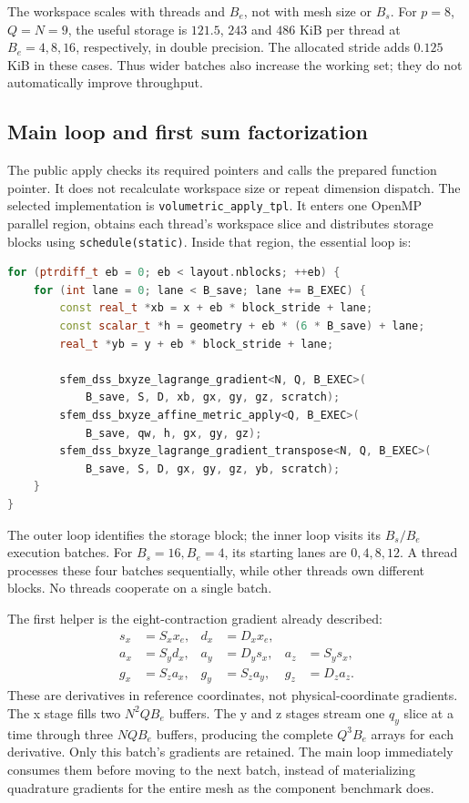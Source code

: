 \documentclass[11pt]{article}
\begin{document}
The workspace scales with threads and \(B_e\), not with mesh size or \(B_s\).
For \(p=8\), \(Q=N=9\), the useful storage is \(121.5\), \(243\) and
\(486\) KiB per thread at \(B_e=4,8,16\), respectively, in double precision.
The allocated stride adds \(0.125\) KiB in these cases. Thus wider batches
also increase the working set; they do not automatically improve throughput.

\subsection{Main loop and first sum factorization}

The public apply checks its required pointers and calls the prepared function
pointer. It does not recalculate workspace size or repeat dimension dispatch.
The selected implementation is \texttt{volumetric\_apply\_tpl}. It enters one
OpenMP parallel region, obtains each thread's workspace slice and distributes
storage blocks using \texttt{schedule(static)}. Inside that region, the
essential loop is:
\begin{lstlisting}[language=C++]
for (ptrdiff_t eb = 0; eb < layout.nblocks; ++eb) {
    for (int lane = 0; lane < B_save; lane += B_EXEC) {
        const real_t *xb = x + eb * block_stride + lane;
        const scalar_t *h = geometry + eb * (6 * B_save) + lane;
        real_t *yb = y + eb * block_stride + lane;

        sfem_dss_bxyze_lagrange_gradient<N, Q, B_EXEC>(
            B_save, S, D, xb, gx, gy, gz, scratch);
        sfem_dss_bxyze_affine_metric_apply<Q, B_EXEC>(
            B_save, qw, h, gx, gy, gz);
        sfem_dss_bxyze_lagrange_gradient_transpose<N, Q, B_EXEC>(
            B_save, S, D, gx, gy, gz, yb, scratch);
    }
}
\end{lstlisting}
The outer loop identifies the storage block; the inner loop visits its
\(B_s/B_e\) execution batches. For \(B_s=16,B_e=4\), its starting lanes are
\(0,4,8,12\). A thread processes these four batches sequentially, while other
threads own different blocks. No threads cooperate on a single batch.

The first helper is the eight-contraction gradient already described:
\[
\begin{aligned}
 s_x&=S_xx_e,& d_x&=D_xx_e,\\
 a_x&=S_yd_x,& a_y&=D_ys_x,& a_z&=S_ys_x,\\
 g_x&=S_za_x,& g_y&=S_za_y,& g_z&=D_za_z.
\end{aligned}
\]
These are derivatives in reference coordinates, not physical-coordinate
gradients. The x stage fills two \(N^2QB_e\) buffers. The y and z stages
stream one \(q_y\) slice at a time through three \(NQB_e\) buffers, producing
the complete \(Q^3B_e\) arrays for each derivative.
Only this batch's gradients are retained. The main loop immediately consumes
them before moving to the next batch, instead of materializing quadrature
gradients for the entire mesh as the component benchmark does.
\end{document}
